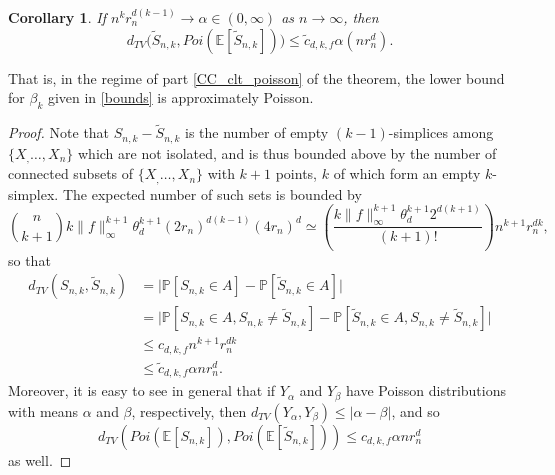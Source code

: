 \documentclass{amsart}
\newtheorem{cor}[thm]{Corollary}
\theoremstyle{definition}
\newcommand{\E}{\mathbb{E}}
\renewcommand{\P}{\mathbb{P}}
\newcommand{\s}{\widetilde{S}}
\renewcommand{\1}{\mathbb{1}}
\begin{document}
\begin{comment}
\begin{align*}
d_{TV}&\big(S_{n,k},Poi(\E[S_{n,k}])\big)\\ & \lesssim \min\left(3,\frac{1}{\E[S_{n,k}]}
\right)\left[\binom{n}{k}\sum_{\ell=1}^{k-1}\binom{k}{\ell}\frac{1}{(k-\ell)!}
n^{k-\ell}\left[(2r_n)^d\theta_d\|f\|_\infty\right]^{2k-\ell-1}\right.\\
& \left.\phantom{\sum_{\ell=1}^{k-1}bbbbbbbbbbbbbbbbbb}+\binom{n}{k}
\frac{k^2n^{k-1}}{k!}\left[(2r_n)^d\theta_d\|f\|_\infty\right]^{2k-2}\right]\\
&\lesssim \frac{1}{\mu(k!)^2}\sum_{\ell=1}^{k-1}\binom{k}{\ell}\frac{1}{
(k-\ell)!}\left[2^d\theta_d\|f\|_\infty\right]^{2k-\ell-1}\left[nr_n^d\right]^{k-
\ell}\\
&\phantom{\sum_{\ell=1}^{k-1}bbbbbbbbbbbbbbbbbb}+\frac{k^2}{\mu(k!)^3}\left[2^d\theta_d\|f\|_\infty\right]^{2k-2}
\left[nr_n^d\right]^{k-1}\\&\lesssim c_{k,d,f}\big[nr_n^d\big],
\end{align*}
for a constant $c_{k,d,f}$ depending on $k$, $d$, and $\|f\|_\infty$.

\end{proof}
\end{comment}


\begin{cor}\label{component-Poisson}
If $n^kr_n^{d(k-1)}\to\alpha\in(0,\infty)$ as $n\to\infty$, then 
$$d_{TV}\big(\s_{n,k},Poi(\E[\s_{n,k}])\big)\le \tilde{c}_{d,k,f}\alpha(nr_n^d).$$
\end{cor}
That is, in the regime of part \ref{CC_clt_poisson} of the theorem, 
the lower bound for $\beta_k$ given in \eqref{bounds} is approximately Poisson.
 
\begin{proof}
Note that $S_{n,k}-\s_{n,k}$ is the number of empty $( k-1)$-simplices among
$\{X_,\ldots,X_n\}$ which are not isolated, and is thus bounded above
by the number of connected subsets of $\{X_,\ldots,X_n\}$ with $k+1$
points, $k$ of which form an empty $k$-simplex.  The expected
number of such sets is 
bounded by $$\binom{n}{k+1}k\|f\|_\infty^{k+1}\theta_d^{k+1}(2r_n)^{d(k-1)}(4r_n)^d
\simeq\left(\frac{k\|f\|_\infty^{k+1}\theta_d^{k+1}2^{d(k+1)}}{(k+1)!}\right)
n^{k+1}r_n^{dk},$$ so that
\begin{equation*}\begin{split}
d_{TV}(S_{n,k},\s_{n,k})&=\big|\P[S_{n,k}\in A]-\P[\s_{n,k}\in A]\big|\\&=
\big|\P[S_{n,k}\in A,S_{n,k}\neq\s_{n,k}]-\P[\s_{n,k}\in A,S_{n,k}\neq\s_{n,k}]
\big|\\&\le c_{d,k,f}n^{k+1}r_n^{dk}\\&\le\tilde{c}_{d,k,f}\alpha nr_n^d.
\end{split}\end{equation*}
Moreover, it is easy to see in general that if $Y_\alpha$ and $Y_\beta$ have Poisson
distributions with means $\alpha$ and $\beta$, respectively, then 
$d_{TV}(Y_\alpha,Y_\beta)\le |\alpha-\beta|$, and so 
$$d_{TV}(Poi(\E[S_{n,k}]),Poi(\E[\s_{n,k}]))\le c_{d,k,f}\alpha nr_n^d$$
as well.

\end{proof}
\end{document}
